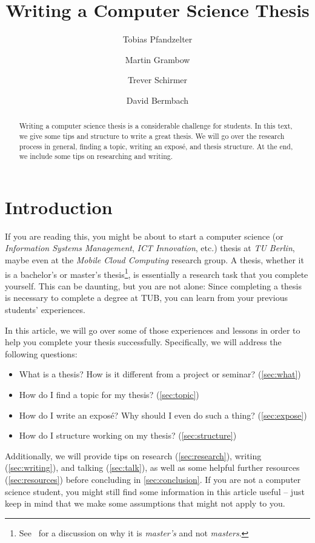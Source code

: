 \documentclass[a4paper]{article}
\title{Writing a Computer Science Thesis}
\author{Tobias Pfandzelter}
\author{Martin Grambow}
\author{Trever Schirmer}
\author{David Bermbach}
\affil{Mobile Cloud Computing Research Group\\TU Berlin \& Einstein Center Digital Future\\Berlin, Germany\\\texttt{\{tp,mg,ts,db\}@mcc.tu-berlin.de}}
\begin{document}
\maketitle
\begin{abstract}
    Writing a computer science thesis is a considerable challenge for students.
    In this text, we give some tips and structure to write a great thesis.
    We will go over the research process in general, finding a topic, writing an expos\'e, and thesis structure.
    At the end, we include some tips on researching and writing.
\end{abstract}

\section{Introduction}
\label{sec:introduction}

If you are reading this, you might be about to start a computer science (or \emph{Information Systems Management}, \emph{ICT Innovation}, etc.) thesis at \emph{TU Berlin}, maybe even at the \emph{Mobile Cloud Computing} research group.
A thesis, whether it is a bachelor's or master's thesis\footnote{See~\cite{masters-apostrophe-as} for a discussion on why it is \emph{master's} and not \emph{masters}.}, is essentially a research task that you complete yourself.
This can be daunting, but you are not alone: Since completing a thesis is necessary to complete a degree at TUB, you can learn from your previous students' experiences.

In this article, we will go over some of those experiences and lessons in order to help you complete your thesis successfully.
Specifically, we will address the following questions:

\begin{itemize}
    \item What is a thesis? How is it different from a project or seminar? (\cref{sec:what})
    \item How do I find a topic for my thesis? (\cref{sec:topic})
    \item How do I write an expos\'e? Why should I even do such a thing? (\cref{sec:expose})
    \item How do I structure working on my thesis? (\cref{sec:structure})
\end{itemize}

Additionally, we will provide tips on research (\cref{sec:research}), writing (\cref{sec:writing}), and talking (\cref{sec:talk}), as well as some helpful further resources (\cref{sec:resources}) before concluding in \cref{sec:conclusion}.
If you are not a computer science student, you might still find some information in this article useful -- just keep in mind that we make some assumptions that might not apply to you.
\end{document}
